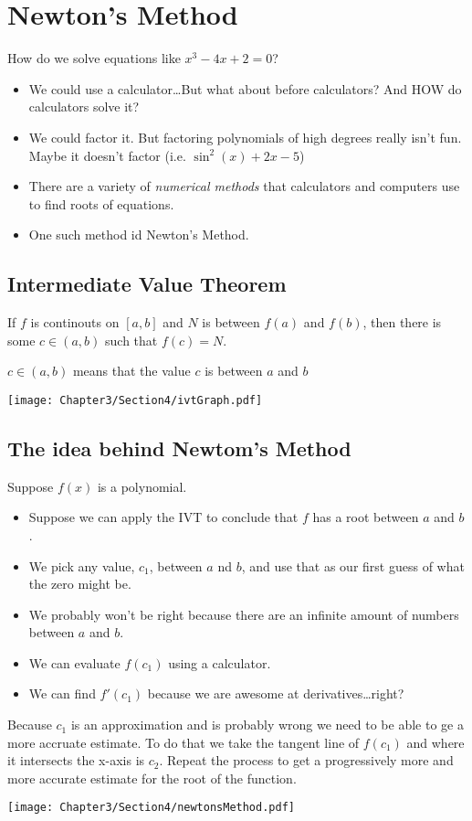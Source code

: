 
\section{Newton's Method}
How do we solve equations like $x^3 - 4x + 2 = 0$?
\begin{itemize}
    \item We could use a calculator\ldots But what about before calculators? And HOW do calculators solve it?
    \item We could factor it. But factoring polynomials of high degrees really isn't fun. Maybe it doesn't factor (i.e. $\sin^2(x) + 2x - 5$)
    \item There are a variety of \textit{numerical methods} that calculators and computers use to find roots of equations.
    \item One such method id Newton's Method.
\end{itemize}
\subsection{Intermediate Value Theorem}
\begin{theorem}
    If $f$ is continouts on $[a, b]$ and $N$ is between $f(a)$ and $f(b)$, then there is some $c \in (a, b)$ such that $f(c) = N$.
    \begin{note}
        $c \in (a, b)$ means that the value $c$ is between $a$ and $b$
    \end{note}
    \texttt{[image: Chapter3/Section4/ivtGraph.pdf]}\\
\end{theorem}
\subsection{The idea behind Newtom's Method}
Suppose $f(x)$ is a polynomial.
\begin{itemize}
    \item Suppose we can apply the IVT to conclude that $f$ has a root between $a$ and $b$.
    \item We pick any value, $c_1$, between $a$ nd $b$, and use that as our first guess of what the zero might be.
    \item We probably won't be right because there are an infinite amount of numbers between $a$ and $b$.
    \item We can evaluate $f(c_1)$ using a calculator.
    \item We can find $f'(c_1)$ because we are awesome at derivatives\ldots right?
\end{itemize}
Because $c_1$ is an approximation and is probably wrong we need to be able to ge a more accruate estimate. To do that we take the tangent line of $f(c_1)$ and where it intersects the x-axis is $c_2$. Repeat the process to get a progressively more and more accurate estimate for the root of the function.
\begin{center}
    \texttt{[image: Chapter3/Section4/newtonsMethod.pdf]}
\end{center}
